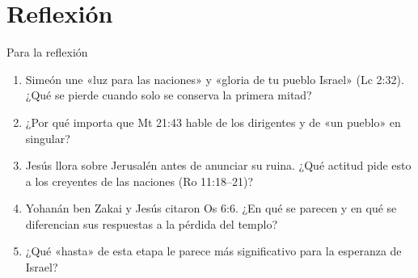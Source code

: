 \section{Reflexión}
\begin{frame}{Para la reflexión}
\small
\begin{enumerate}
\item Simeón une «luz para las naciones» y «gloria de tu pueblo Israel» (Lc 2:32). ¿Qué se pierde cuando solo se conserva la primera mitad?
\item ¿Por qué importa que Mt 21:43 hable de los dirigentes y de «un pueblo» en singular?
\item Jesús llora sobre Jerusalén antes de anunciar su ruina. ¿Qué actitud pide esto a los creyentes de las naciones (Ro 11:18--21)?
\item Yohanán ben Zakai y Jesús citaron Os 6:6. ¿En qué se parecen y en qué se diferencian sus respuestas a la pérdida del templo?
\item ¿Qué «hasta» de esta etapa le parece más significativo para la esperanza de Israel?
\end{enumerate}
\end{frame}

